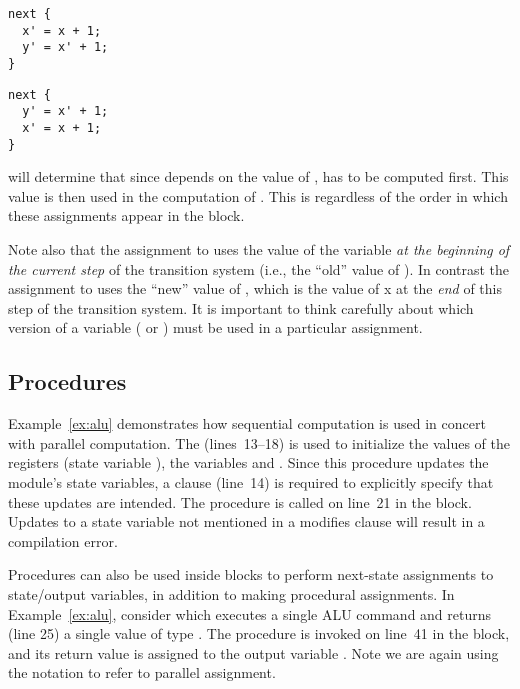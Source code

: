 \begin{lstlisting}[language=uclid,style=uclidstyle]
next {
  x' = x + 1;
  y' = x' + 1;
}
\end{lstlisting}

\begin{lstlisting}[language=uclid,style=uclidstyle]
next {
  y' = x' + 1;
  x' = x + 1;
}
\end{lstlisting}

    \uclid{} will determine that since  depends on the value of ,  has to be computed first. This value is then used in the computation of . This is regardless of the order in which these assignments appear in the  block.

    Note also that the assignment to  uses the value of the variable  \emph{at the beginning of the current step} of the transition system (i.e., the ``old'' value of ). In contrast the assignment to  uses the ``new'' value of , which is the value of x at the \emph{end} of this step of the transition system. It is important to think carefully about which version of a variable ( or ) must be used in a particular assignment.

\subsection{Procedures}
Example~\ref{ex:alu} demonstrates how sequential computation is used in concert with parallel computation. The   (lines~13--18) is used to initialize the values of the registers (state variable ), the variables  and . Since this procedure updates the module's state variables, a  clause (line~14) is required to explicitly specify that these updates are intended. The procedure is called on line~21 in the  block. Updates to a state variable not mentioned in a modifies clause will result in a compilation error.

Procedures can also be used inside  blocks to perform
next-state assignments to state/output variables, in addition to 
making procedural assignments.
In Example~\ref{ex:alu}, consider   which executes a single ALU command and returns (line 25) a single value of type . The procedure is invoked on line~41 in the  block, and its return value is assigned to the output variable . Note we are again using the notation  to refer to parallel assignment.

